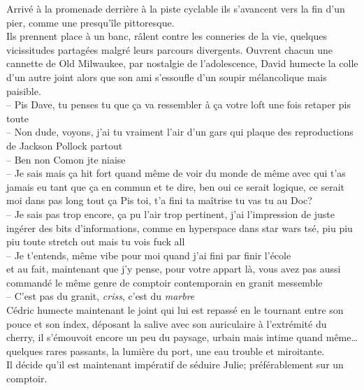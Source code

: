 Arrivé à la promenade derrière à la piste cyclable ils s'avancent vers la
fin d'un pier, comme une presqu'île pittoresque. \\ Ils prennent place à un
banc, râlent contre les conneries de la vie, quelques vicissitudes partagées
malgré leurs parcours divergents. Ouvrent chacun une cannette de Old Milwaukee,
par nostalgie de l'adolescence, David humecte la colle d'un autre joint alors que
son ami s'essoufle d'un soupir mélancolique mais paisible.
\\ -- Pis Dave, tu
penses tu que ça va ressembler à ça votre loft une fois retaper pis toute\\ 
-- Non dude, voyons, j'ai tu vraiment l'air d'un gars qui plaque des
reproductions de
Jackson 
Pollock partout \\
-- Ben non Comon jte niaise\\
-- Je sais mais ça hit fort quand même de voir du monde de même avec qui
t'as jamais eu tant que ça en commun et te dire, ben oui ce serait logique,
ce serait moi dans pas long tout ça \textelp{} Pis toi, t'a fini ta maîtrise tu
vas tu au Doc?\\
-- Je sais pas trop encore, ça pu l'air trop pertinent, j'ai l'impression
de juste ingérer des bits d'informations, comme en hyperspace dans star wars 
tsé, piu piu piu toute stretch out mais tu vois fuck all\\
-- Je t'entends, même vibe pour moi quand j'ai fini par finir l'école\\

\textelp{} et au fait, maintenant que j'y pense, pour votre appart là, vous
avez pas aussi commandé le même genre de comptoir contemporain en granit
messemble\\
-- C'est pas du granit, \emph{criss}, c'est du \emph{marbre}\\

Cédric humecte maintenant le joint qui lui est repassé en le tournant entre son
pouce et son index, déposant la salive avec son auriculaire à l'extrémité du
cherry, il s'émouvoit encore un peu du paysage, urbain mais intime quand
même\ldots quelques rares passants, la lumière du port, une eau trouble et
miroitante.\\[1ex] Il décide qu'il est maintenant impératif de séduire Julie; préférablement sur un comptoir.
\clearpage

